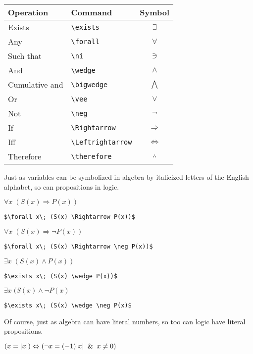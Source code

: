 \medskip

\begin{tabular}{l l c}
\textbf{Operation} & \textbf{Command} & \textbf{Symbol} \\
\hline
Exists & \verb"\exists" & $\exists$ \\
Any & \verb"\forall" & $\forall$ \\
Such that & \verb$\ni$ & $\ni$ \\
And & \verb"\wedge" & $\wedge$ \\
Cumulative and & \verb"\bigwedge" & $\bigwedge$ \\
Or & \verb"\vee" & $\vee$ \\
Not & \verb"\neg" & $\neg$ \\
If & \verb$\Rightarrow$ & $\Rightarrow$ \\
Iff & \verb$\Leftrightarrow$ & $\Leftrightarrow$ \\
Therefore & \verb$\therefore$ & $\therefore$
\end{tabular}

\bigskip

Just as variables can be symbolized in algebra by italicized letters of the English alphabet, so can propositions in logic.

\medskip

$\forall x\; (S(x) \Rightarrow P(x))$

\smallskip

\verb=$\forall x\; (S(x) \Rightarrow P(x))$=

\medskip

$\forall x\; (S(x) \Rightarrow \neg P(x))$

\smallskip

\verb=$\forall x\; (S(x) \Rightarrow \neg P(x))$=

\medskip

$\exists x\; (S(x) \wedge P(x))$

\smallskip

\verb=$\exists x\; (S(x) \wedge P(x))$=

\medskip

$\exists x\; (S(x) \wedge \neg P(x)$

\smallskip

\verb=$\exists x\; (S(x) \wedge \neg P(x)$=

\bigskip

Of course, just as algebra can have literal numbers, so too can logic have literal propositions.

\medskip

$(x = |x|) \Leftrightarrow (\neg x = (-1)|x| \And x \neq 0)$

